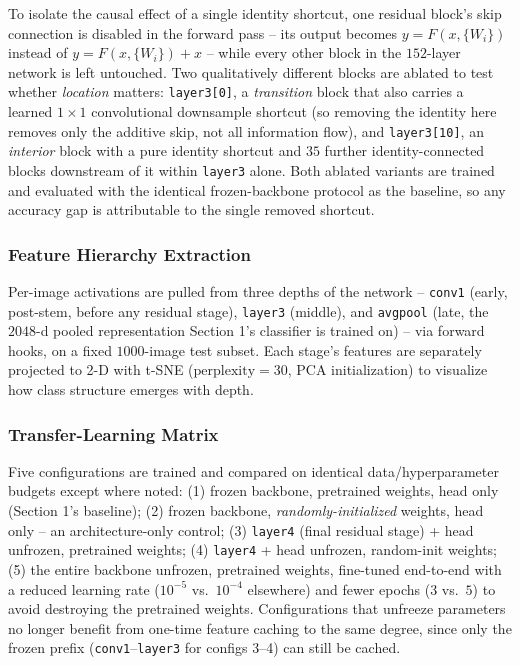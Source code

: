 To isolate the causal effect of a single identity shortcut, one residual
block's skip connection is disabled in the forward pass -- its output
becomes $y=F(x,\{W_i\})$ instead of $y=F(x,\{W_i\})+x$ -- while every other
block in the $152$-layer network is left untouched. Two qualitatively
different blocks are ablated to test whether \emph{location} matters:
\texttt{layer3[0]}, a \emph{transition} block that also carries a
learned $1{\times}1$ convolutional downsample shortcut (so removing the
identity here removes only the additive skip, not all information flow),
and \texttt{layer3[10]}, an \emph{interior} block with a pure identity
shortcut and $35$ further identity-connected blocks downstream of it within
\texttt{layer3} alone. Both ablated variants are trained and evaluated with
the identical frozen-backbone protocol as the baseline, so any accuracy gap
is attributable to the single removed shortcut.

\subsubsection{Feature Hierarchy Extraction}

Per-image activations are pulled from three depths of the network --
\texttt{conv1} (early, post-stem, before any residual stage),
\texttt{layer3} (middle), and \texttt{avgpool} (late, the $2048$-d
pooled representation Section 1's classifier is trained on) -- via forward
hooks, on a fixed $1000$-image test subset. Each stage's features are
separately projected to 2-D with t-SNE ($\text{perplexity}=30$, PCA
initialization) to visualize how class structure emerges with depth.

\subsubsection{Transfer-Learning Matrix}

Five configurations are trained and compared on identical
data/hyperparameter budgets except where noted: (1) frozen backbone,
pretrained weights, head only (Section 1's baseline); (2) frozen backbone,
\emph{randomly-initialized} weights, head only -- an architecture-only
control; (3) \texttt{layer4} (final residual stage) + head unfrozen,
pretrained weights; (4) \texttt{layer4} + head unfrozen, random-init
weights; (5) the entire backbone unfrozen, pretrained weights, fine-tuned
end-to-end with a reduced learning rate ($10^{-5}$ vs.\ $10^{-4}$ elsewhere)
and fewer epochs ($3$ vs.\ $5$) to avoid destroying the pretrained weights.
Configurations that unfreeze parameters no longer benefit from one-time
feature caching to the same degree, since only the frozen prefix
(\texttt{conv1}--\texttt{layer3} for configs 3--4) can still be cached.

